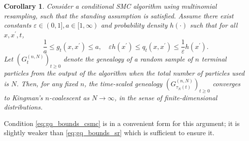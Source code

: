 \documentclass{article}
\newtheorem{corollary}{Corollary}
\theoremstyle{definition}
\newcommand{\1}[1]{\mathbbm{1}_{\{#1\}}}
\begin{document}
\begin{corollary}\label{thm:CSMC_newassns}
Consider a conditional SMC algorithm using multinomial resampling, such that the standing assumption is satisfied. Assume there exist constants $\varepsilon\in (0,1], a\in [1,\infty)$ and probability density $h(\cdot)$ such that for all $x, x^\prime, t$,
\begin{equation}\label{eq:gq_bounds_csmc}
\frac{1}{a} \leq g_t(x, x^\prime) \leq a , \quad
\varepsilon h(x^\prime) \leq q_t(x, x^\prime) \leq \frac{1}{\varepsilon} h(x^\prime) .
\end{equation}
Let $(G_t^{(n,N)})_{t\geq0}$ denote the genealogy of a random sample of $n$ terminal particles from the output of the algorithm when the total number of particles used is $N$. Then, for any fixed $n$, the time-scaled genealogy $(G_{\tau_N(t)}^{(n,N)})_{t\geq0}$ converges to Kingman's $n$-coalescent as $N\to \infty$, in the sense of finite-dimensional distributions.
\end{corollary}
Condition \eqref{eq:gq_bounds_csmc} is in a convenient form for this argument; it is slightly weaker than \eqref{eq:gq_bounds_sr} which is sufficient to ensure it.
\end{document}
